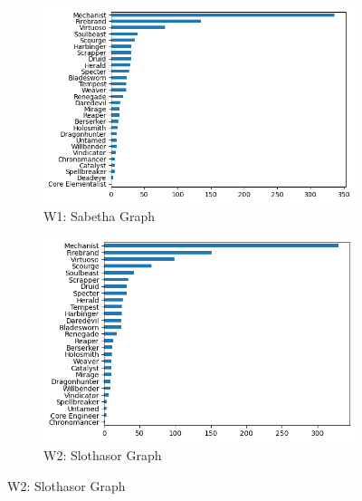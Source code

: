 \documentclass[12pt,a4paper]{article}
\begin{document}
    \newpage

    \begin{figure}[h!]

        \centering

        \begin{subfigure}{0.5\textwidth}
            \centering
            \includegraphics[scale=0.4]{sab_graph.png}
            \caption{\small W1: Sabetha Graph}
        \end{subfigure}%
        \begin{subfigure}{0.5\textwidth}
            \centering
            \includegraphics[scale=0.4]{sloth_graph.png}
            \caption{\small W2: Slothasor Graph}
        \end{subfigure}


\end{figure}
\end{document}
